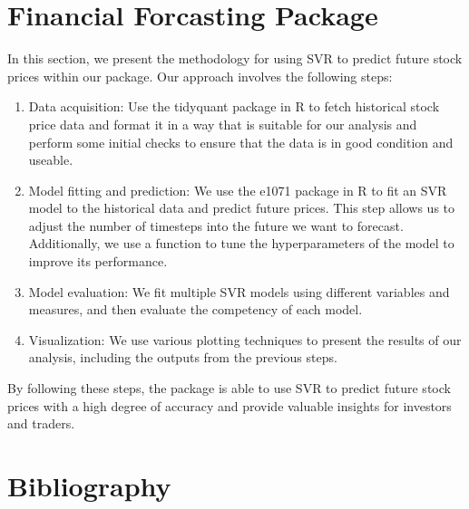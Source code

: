 \documentclass[11pt]{article}
\theoremstyle{definition}
\begin{document}
\newpage

\section{Financial Forcasting Package}
In this section, we present the methodology for using SVR to predict future stock prices within our package. Our approach involves the following steps:
\begin{enumerate}
  \item Data acquisition: Use the tidyquant package in R to fetch historical stock price data and format it in a way that is suitable for our analysis and perform some initial checks to ensure that the data is in good condition and useable. 
  \item Model fitting and prediction: We use the e1071 package in R to fit an SVR model to the historical data and predict future prices. This step allows us to adjust the number of timesteps into the future we want to forecast. Additionally, we use a function to tune the hyperparameters of the model to improve its performance.
  \item Model evaluation: We fit multiple SVR models using different variables and measures, and then evaluate the competency of each model.
  \item Visualization: We use various plotting techniques to present the results of our analysis, including the outputs from the previous steps.
\end{enumerate}

By following these steps, the package is able to use SVR to predict future stock prices with a high degree of accuracy and provide valuable insights for investors and traders.

\newpage


\section{Bibliography}
\printbibliography
\end{document}
